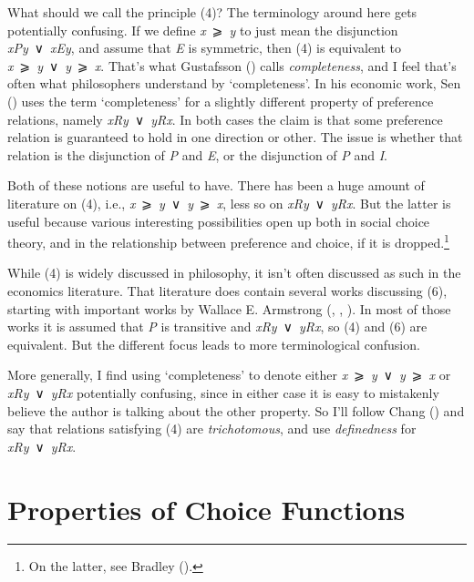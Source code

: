 \documentclass[
  11pt,
  letterpaper,
  DIV=11,
  numbers=noendperiod,
  twoside]{scrartcl}
\begin{document}
What should we call the principle (4)? The terminology around here gets
potentially confusing. If we define \emph{x}~⩾~\emph{y} to just mean the
disjunction \emph{xPy}~∨~\emph{xEy}, and assume that \emph{E} is
symmetric, then (4) is equivalent to
\emph{x}~⩾~\emph{y}~∨~\emph{y}~⩾~\emph{x}. That's what Gustafsson
() calls \emph{completeness},
and I feel that's often what philosophers understand by `completeness'.
In his economic work, Sen ()
uses the term `completeness' for a slightly different property of
preference relations, namely \emph{xRy}~∨~\emph{yRx}. In both cases the
claim is that some preference relation is guaranteed to hold in one
direction or other. The issue is whether that relation is the
disjunction of \emph{P} and \emph{E}, or the disjunction of \emph{P} and
\emph{I}.

Both of these notions are useful to have. There has been a huge amount
of literature on (4), i.e., \emph{x}~⩾~\emph{y}~∨~\emph{y}~⩾~\emph{x},
less so on \emph{xRy}~∨~\emph{yRx}. But the latter is useful because
various interesting possibilities open up both in social choice theory,
and in the relationship between preference and choice, if it is
dropped.\footnote{On the latter, see Bradley
  ().}

While (4) is widely discussed in philosophy, it isn't often discussed as
such in the economics literature. That literature does contain several
works discussing (6), starting with important works by Wallace E.
Armstrong (,
, ).
In most of those works it is assumed that \emph{P} is transitive and
\emph{xRy}~∨~\emph{yRx}, so (4) and (6) are equivalent. But the
different focus leads to more terminological confusion.

More generally, I find using `completeness' to denote either
\emph{x}~⩾~\emph{y}~∨~\emph{y}~⩾~\emph{x} or \emph{xRy}~∨~\emph{yRx}
potentially confusing, since in either case it is easy to mistakenly
believe the author is talking about the other property. So I'll follow
Chang () and say that relations satisfying
(4) are \emph{trichotomous}, and use \emph{definedness} for
\emph{xRy}~∨~\emph{yRx}.

\section{Properties of Choice Functions}\label{sec-properties}
\end{document}
